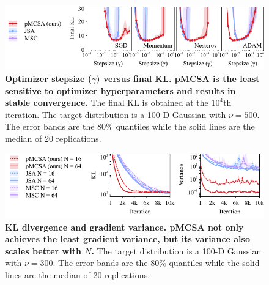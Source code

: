 

\begin{figure}
  \vspace{-0.2in}
  \centering
  \includegraphics[scale=0.9]{figures/stepsize_02.pdf}
  \vspace{-0.05in}
  \caption{\textbf{Optimizer stepsize (\(\gamma\)) versus final KL.
      pMCSA is the least sensitive to optimizer hyperparameters and results in stable convergence.}
      The final KL is obtained at the \(10^4\)th iteration.
      The target distribution is a 100-D Gaussian with \(\nu = 500\).
      The error bands are the 80\% quantiles while the solid lines are the median of 20 replications.
  }\label{fig:stepsize}
\end{figure}
\begin{figure}
  \vspace{-0.1in}
  \centering
  \includegraphics[scale=0.9]{figures/gaussian_02.pdf}
  \vspace{-0.07in}
  \caption{\textbf{
      KL divergence and gradient variance.
      pMCSA not only achieves the least gradient variance, but its variance also scales better with \(N\).
    }
    The target distribution is a 100-D Gaussian with \(\nu = 300\).
    The error bands are the 80\% quantiles while the solid lines are the median of 20 replications.
  }\label{fig:gaussian}
  \vspace{-0.2in}
\end{figure}

